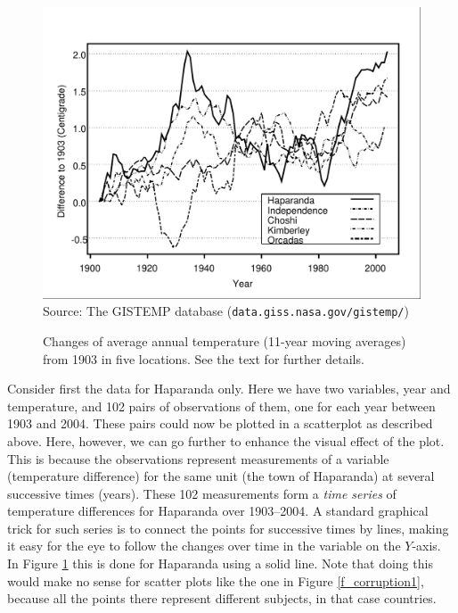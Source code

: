 \begin{figure}[t]
\caption{Changes of average annual temperature (11-year moving averages)
from 1903 in five locations. See the text for further details.}
\label{f_temperatures}
\begin{center}
\includegraphics[width=13cm]{temperplot}\\
\footnotesize{Source: The GISTEMP database
(\texttt{data.giss.nasa.gov/gistemp/})}
\end{center}

\end{figure}

Consider first the data for Haparanda only. Here we have two variables,
year and temperature, and 102 pairs of observations of them, one for
each year between 1903 and 2004. These pairs could now be plotted in a
scatterplot as described above. Here, however, we can go further to
enhance the visual effect of the plot. This is because the observations
represent measurements of a variable (temperature difference) for
the same unit (the town of Haparanda) at several successive times
(years). These 102 measurements form a \emph{time series} of temperature
differences for Haparanda over 1903--2004. A standard graphical trick
for such series is to connect the points for successive times by
lines, making it easy for the eye to follow the changes over time in the
variable on the $Y$-axis. In Figure \ref{f_temperatures} this is done
for Haparanda using a solid line. Note that doing this would make no
sense for scatter plots like the one in Figure \ref{f_corruption1}, because
all the points there represent different subjects, in that case countries.

